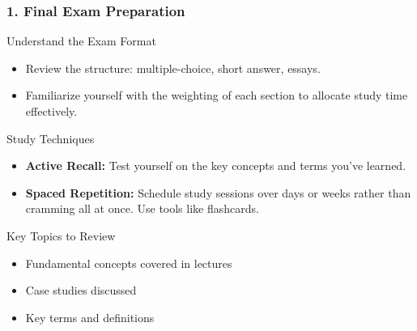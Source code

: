 \documentclass{beamer}
\begin{document}
\begin{frame}[fragile]
    \frametitle{1. Final Exam Preparation}
    \begin{block}{Understand the Exam Format}
        \begin{itemize}
            \item Review the structure: multiple-choice, short answer, essays.
            \item Familiarize yourself with the weighting of each section to allocate study time effectively.
        \end{itemize}
    \end{block}

    \begin{block}{Study Techniques}
        \begin{itemize}
            \item \textbf{Active Recall:} Test yourself on the key concepts and terms you've learned.
            \item \textbf{Spaced Repetition:} Schedule study sessions over days or weeks rather than cramming all at once. Use tools like flashcards.
        \end{itemize}
    \end{block}

    \begin{block}{Key Topics to Review}
        \begin{itemize}
            \item Fundamental concepts covered in lectures
            \item Case studies discussed
            \item Key terms and definitions
        \end{itemize}
    \end{block}
\end{frame}
\end{document}

